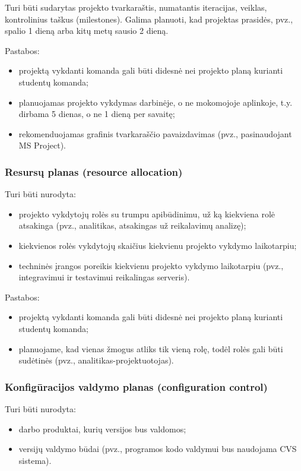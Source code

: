 \documentclass[12pt,a4paper]{article}
\begin{document}
Turi būti sudarytas projekto tvarkaraštis, numatantis iteracijas, veiklas, kontrolinius taškus (milestones). Galima planuoti, kad projektas prasidės, pvz., spalio 1 dieną arba kitų metų sausio 2 dieną.

Pastabos:
\begin{itemize}
    \item projektą vykdanti komanda gali būti didesnė nei projekto planą kurianti studentų komanda;
    \item planuojamas projekto vykdymas darbinėje, o ne mokomojoje aplinkoje, t.y. dirbama 5 dienas, o ne 1 dieną per savaitę;
    \item rekomenduojamas grafinis tvarkaraščio pavaizdavimas (pvz., pasinaudojant MS Project).
\end{itemize}

\subsubsection*{Resursų planas (resource allocation)}

Turi būti nurodyta:
\begin{itemize}
    \item projekto vykdytojų rolės su trumpu apibūdinimu, už ką kiekviena rolė atsakinga (pvz., analitikas, atsakingas už reikalavimų analizę);
    \item kiekvienos rolės vykdytojų skaičius kiekvienu projekto vykdymo laikotarpiu;
    \item techninės įrangos poreikis kiekvienu projekto vykdymo laikotarpiu (pvz., integravimui ir testavimui reikalingas serveris).
\end{itemize}

Pastabos:
\begin{itemize}
    \item projektą vykdanti komanda gali būti didesnė nei projekto planą kurianti studentų komanda;
    \item planuojame, kad vienas žmogus atliks tik vieną rolę, todėl rolės gali būti sudėtinės (pvz., analitikas-projektuotojas).
\end{itemize}

\subsubsection*{Konfigūracijos valdymo planas (configuration control)}

Turi būti nurodyta:
\begin{itemize}
    \item darbo produktai, kurių versijos bus valdomos;
    \item versijų valdymo būdai (pvz., programos kodo valdymui bus naudojama CVS sistema).
\end{itemize}
\end{document}
